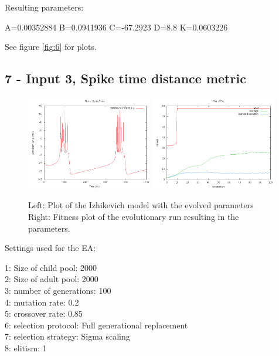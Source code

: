 \documentclass[11pt]{article}
\begin{document}
Resulting parameters:

A=0.00352884 B=0.0941936 C=-67.2923 D=8.8 K=0.0603226

See figure \ref{fig:6} for plots.

\subsection*{7 - Input 3, Spike time distance metric}

\begin{figure}
\begin{center}
\mbox{\includegraphics[width=0.49\textwidth]{images/7-res.png}}
\mbox{\includegraphics[width=0.49\textwidth]{images/7-fit.png}}
\end{center}
\caption{Left: Plot of the Izhikevich model with the evolved parameters\\
Right: Fitness plot of the evolutionary run resulting in the parameters.}
\label{fig:7}
\end{figure}

Settings used for the EA:

1: Size of child pool: 2000\\
2: Size of adult pool: 2000\\
3: number of generations: 100\\
4: mutation rate: 0.2\\
5: crossover rate: 0.85\\
6: selection protocol: Full generational replacement\\
7: selection strategy: Sigma scaling\\
8: elitism: 1\\
\end{document}
